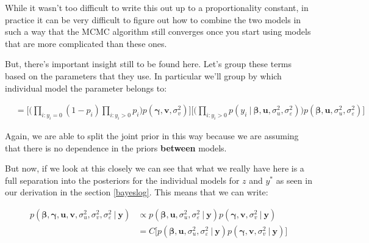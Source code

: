 \documentclass[12pt,twoside]{reedthesis}
\begin{document}
While it wasn't too difficult to write this out up to a proportionality constant, in practice it can be very difficult to figure out how to combine the two models in such a way that the MCMC algorithm still converges once you start using models that are more complicated than these ones.

But, there's important insight still to be found here. Let's group these terms based on the parameters that they use. In particular we'll group by which individual model the parameter belongs to:

\[
\begin{aligned}
&= \Bigg[\Big(\prod_{i:y_i = 0}(1- p_i)\prod_{i: y_i > 0}p_i\Big)p(\boldsymbol{\gamma}, \mathbf{v}, \sigma_v^2)\Bigg]\Bigg[\Big(\prod_{i:y_i > 0}p(y_i \ | \ \boldsymbol{\beta}, \mathbf{u}, \sigma_u^2, \sigma_{\varepsilon}^2)\Big)p(\boldsymbol{\beta},\mathbf{u}, \sigma_u^2, \sigma_{\varepsilon}^2)\Bigg]
\end{aligned}
\]

Again, we are able to split the joint prior in this way because we are assuming that there is no dependence in the priors \textbf{between} models.

But now, if we look at this closely we can see that what we really have here is a full separation into the posteriors for the individual models for \(z\) and \(y^*\) as seen in our derivation in the section \ref{bayeslog}. This means that we can write:

\[
\begin{aligned}
p(\boldsymbol{\beta}, \boldsymbol{\gamma}, \mathbf{u}, \mathbf{v}, \sigma_u^2, \sigma_v^2, \sigma_{\varepsilon}^2\ | \ \mathbf{y})  &\propto p(\boldsymbol{\beta}, \mathbf{u}, \sigma_u^2, \sigma_{\varepsilon}^2 \ | \ \mathbf{y})p(\boldsymbol{\gamma}, \mathbf{v}, \sigma_v^2 \ | \ \mathbf{y}) \\
  &= C\bigg[p(\boldsymbol{\beta}, \mathbf{u}, \sigma_u^2, \sigma_{\varepsilon}^2 \ | \ \mathbf{y})p(\boldsymbol{\gamma}, \mathbf{v}, \sigma_v^2 \ | \ \mathbf{y})\bigg]
\end{aligned}
\]
\end{document}
